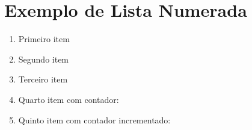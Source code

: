 \documentclass{article}
\newcounter{mycounter} %
\begin{document}
\section*{Exemplo de Lista Numerada}

\begin{enumerate}
    \item Primeiro item
    \item Segundo item
    \item Terceiro item
    
    \setcounter{mycounter}{3} %
    
    \item Quarto item com contador: 
    
    
    \item Quinto item com contador incrementado: 
\end{enumerate}
\end{document}

